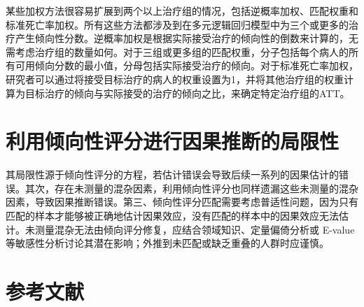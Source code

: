 \documentclass[
  chinese-hans,
  letterpaper,
  DIV=11,
  numbers=noendperiod]{scrreprt}
\begin{document}
某些加权方法很容易扩展到两个以上治疗组的情况，包括逆概率加权、匹配权重和标准死亡率加权。所有这些方法都涉及到在多元逻辑回归模型中为三个或更多的治疗产生倾向性分数。逆概率加权是根据实际接受治疗的倾向性的倒数来计算的，无需考虑治疗组的数量如何。对于三组或更多组的匹配权重，分子包括每个病人的所有可用倾向分数的最小值，分母包括实际接受治疗的倾向。对于标准死亡率加权，研究者可以通过将接受目标治疗的病人的权重设置为1，并将其他治疗组的权重计算为目标治疗的倾向与实际接受的治疗的倾向之比，来确定特定治疗组的ATT。

\section{利用倾向性评分进行因果推断的局限性}\label{ux5229ux7528ux503eux5411ux6027ux8bc4ux5206ux8fdbux884cux56e0ux679cux63a8ux65adux7684ux5c40ux9650ux6027}

其局限性源于倾向性评分的方程，若估计错误会导致后续一系列的因果估计的错误。其次，存在未测量的混杂因素，利用倾向性评分也同样遗漏这些未测量的混杂因素，导致因果推断错误。第三、倾向性评分匹配需要考虑普适性问题，因为只有匹配的样本才能够被正确地估计因果效应，没有匹配的样本中的因果效应无法估计。未测量混杂无法由倾向评分修复，应结合领域知识、定量偏倚分析或
E-value
等敏感性分析讨论其潜在影响；外推到未匹配或缺乏重叠的人群时应谨慎。

\section{参考文献}\label{ux53c2ux8003ux6587ux732e-7}
\end{document}
